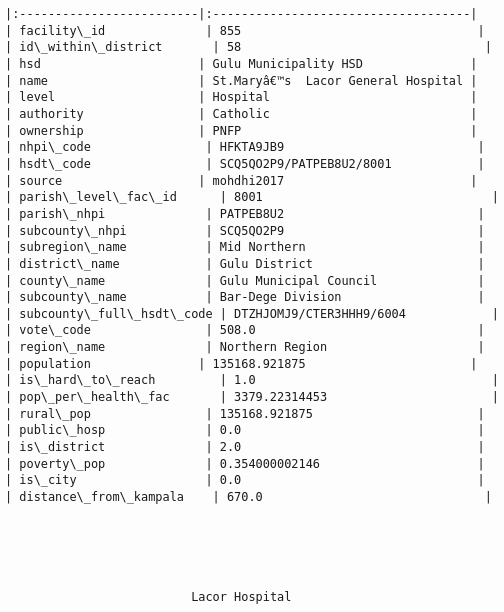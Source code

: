 \documentclass[11pt]{article}
\begin{document}
\begin{Verbatim}[commandchars=\\\{\}]
|:-------------------------|:------------------------------------|
| facility\_id              | 855                                 |
| id\_within\_district       | 58                                  |
| hsd                      | Gulu Municipality HSD               |
| name                     | St.Maryâ€™s  Lacor General Hospital |
| level                    | Hospital                            |
| authority                | Catholic                            |
| ownership                | PNFP                                |
| nhpi\_code                | HFKTA9JB9                           |
| hsdt\_code                | SCQ5QO2P9/PATPEB8U2/8001            |
| source                   | mohdhi2017                          |
| parish\_level\_fac\_id      | 8001                                |
| parish\_nhpi              | PATPEB8U2                           |
| subcounty\_nhpi           | SCQ5QO2P9                           |
| subregion\_name           | Mid Northern                        |
| district\_name            | Gulu District                       |
| county\_name              | Gulu Municipal Council              |
| subcounty\_name           | Bar-Dege Division                   |
| subcounty\_full\_hsdt\_code | DTZHJOMJ9/CTER3HHH9/6004            |
| vote\_code                | 508.0                               |
| region\_name              | Northern Region                     |
| population               | 135168.921875                       |
| is\_hard\_to\_reach         | 1.0                                 |
| pop\_per\_health\_fac       | 3379.22314453                       |
| rural\_pop                | 135168.921875                       |
| public\_hosp              | 0.0                                 |
| is\_district              | 2.0                                 |
| poverty\_pop              | 0.354000002146                      |
| is\_city                  | 0.0                                 |
| distance\_from\_kampala    | 670.0                               |





                          Lacor Hospital                          


\end{Verbatim}
\end{document}
